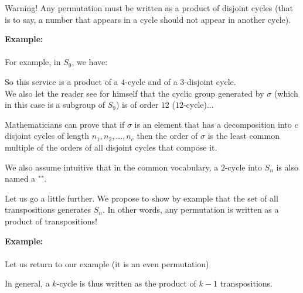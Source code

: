 \begin{enumerate}
		Warning! Any permutation must be written as a product of disjoint cycles (that is to say, a number that appears in a cycle should not appear in another cycle).
		
		\begin{tcolorbox}[colframe=black,colback=white,sharp corners]
		\textbf{{\Large {}}Example:}\\\\
		For example, in $S_9$, we have:
		
		So this service is a product of a $4$-cycle and of a $3$-disjoint cycle.\\
		
		We also let the reader see for himself that the cyclic group generated by $\sigma$ (which in this case is a subgroup of $S_9$) is of order $12$ ($12$-cycle)...
		\end{tcolorbox}
		\begin{tcolorbox}[title=Remark,colframe=black,arc=10pt]
		Mathematicians can prove that if $\sigma$ is an element that has a decomposition into $c$ disjoint cycles of length $n_1,n_2,...,n_c$ then the order of $\sigma$ is the least common multiple of the orders of all disjoint cycles that compose it.
		\end{tcolorbox}	
	\end{enumerate} 
	We also assume intuitive that in the common vocabulary, a $2$-cycle into $S_n$ is also named a "".
	
	Let us go a little further. We propose to show by example that the set of all transpositions generates $S_n$. In other words, any permutation is written as a product of transpositions!
	
	\begin{tcolorbox}[colframe=black,colback=white,sharp corners]
	\textbf{{\Large {}}Example:}\\\\
	Let us return to our example (it is an even permutation)
		
	\end{tcolorbox}
	In general, a $k$-cycle is thus written as the product of $k-1$ transpositions.
	
